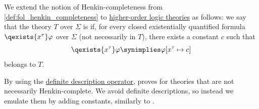 \begin{definition}\label{def:hol_henkin_completeness}\mimprovised
  We extend the notion of Henkin-completeness from \cref{def:fol_henkin_completeness} to \hyperref[def:hol_theory]{higher-order logic theories} as follows: we say that the theory \( T \) over \( \Sigma \) is  if, for every closed existentially quantified formula \( \qexists {x^\tau} \varphi \) over \( \Sigma \) (not necessarily in \( T \)), there exists a constant \( c \) such that
  \begin{equation}\label{eq:def:hol_henkin_completeness/axiom}
    \qexists {x^\tau} \varphi \synimplies \varphi[x^\tau \mapsto c]
  \end{equation}
  belongs to \( T \).
\end{definition}
\begin{comments}
  \item By using the \hyperref[rem:hol_definite_description]{definite description operator}, \textcite[thm. 1]{Henkin1950CompletenessInTheoryOfTypes} proves  for theories that are not necessarily Henkin-complete. We avoid definite descriptions, so instead we emulate them by adding constants, similarly to .
\end{comments}

